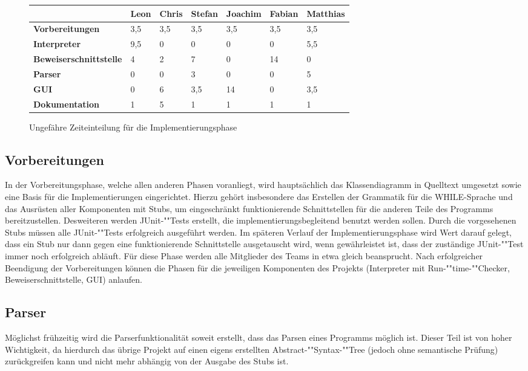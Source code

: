 \begin{figure}[H]
\caption[B]{Ungefähre Zeiteinteilung für die Implementierungsphase}
\label{timeplan}
\begin{tabular}{|l|l|l|l|l|l|l|}

\hline
 & \textbf{Leon} & \textbf{Chris} & \textbf{Stefan} & \textbf{Joachim} & \textbf{Fabian} & \textbf{Matthias} \\
\hline
\textbf{Vorbereitungen} & 3,5 & 3,5 & 3,5 & 3,5 & 3,5 & 3,5 \\
\hline
\textbf{Interpreter} & 9,5 & 0 & 0 & 0 & 0 & 5,5 \\
\hline
\textbf{Beweiserschnittstelle} & 4 & 2 & 7 & 0 & 14 & 0 \\
\hline
\textbf{Parser} & 0 & 0 & 3 & 0 & 0 & 5 \\
\hline
\textbf{GUI} & 0 & 6 & 3,5 & 14 & 0 & 3,5 \\
\hline
\textbf{Dokumentation} & 1 & 5 & 1 & 1 & 1 & 1 \\
\hline
\end{tabular}
\end{figure}

\subsection{Vorbereitungen}
In der Vorbereitungsphase, welche allen anderen Phasen voranliegt, wird hauptsächlich das Klassendiagramm in Quelltext umgesetzt sowie eine Basis für die Implementierungen eingerichtet. Hierzu gehört insbesondere das Erstellen der Grammatik für die WHILE-Sprache und das Ausrüsten aller Komponenten mit Stubs, um eingeschränkt funktionierende Schnittstellen für die anderen Teile des Programms bereitzustellen. Desweiteren werden JUnit-""Tests erstellt, die implementierungsbegleitend benutzt werden sollen. Durch die vorgesehenen Stubs müssen alle JUnit-""Tests erfolgreich ausgeführt werden. Im späteren Verlauf der Implementierungsphase wird Wert darauf gelegt, dass ein Stub nur dann gegen eine funktionierende Schnittstelle ausgetauscht wird, wenn gewährleistet ist, dass der zuständige JUnit-""Test immer noch erfolgreich abläuft. Für diese Phase werden alle Mitglieder des Teams in etwa gleich beansprucht. Nach erfolgreicher Beendigung der Vorbereitungen können die Phasen für die jeweiligen Komponenten des Projekts (Interpreter mit Run-""time-""Checker, Beweiserschnittstelle, GUI) anlaufen.

\subsection{Parser}
Möglichst frühzeitig wird die Parserfunktionalität soweit erstellt, dass das Parsen eines Programms möglich ist. Dieser Teil ist von hoher Wichtigkeit, da hierdurch das übrige Projekt auf einen eigens erstellten Abstract-""Syntax-""Tree (jedoch ohne semantische Prüfung) zurückgreifen kann und nicht mehr abhängig von der Ausgabe des Stubs ist.

